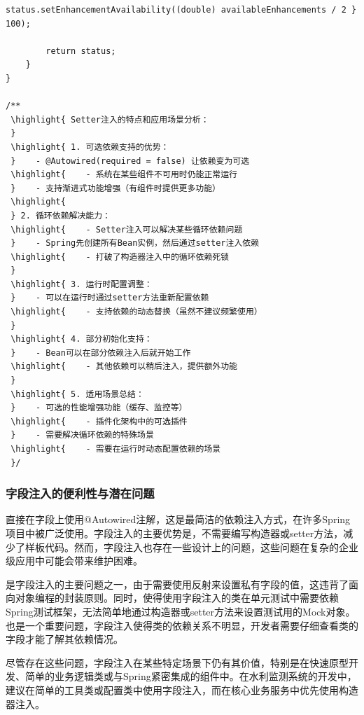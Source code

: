 \begin{lstlisting}[style=java]
        status.setEnhancementAvailability((double) availableEnhancements / 2 } 100);
        
        return status;
    }
}

/**
 \highlight{ Setter注入的特点和应用场景分析：
 } 
 \highlight{ 1. 可选依赖支持的优势：
 }    - @Autowired(required = false) 让依赖变为可选
 \highlight{    - 系统在某些组件不可用时仍能正常运行
 }    - 支持渐进式功能增强（有组件时提供更多功能）
 \highlight{ 
 } 2. 循环依赖解决能力：
 \highlight{    - Setter注入可以解决某些循环依赖问题
 }    - Spring先创建所有Bean实例，然后通过setter注入依赖
 \highlight{    - 打破了构造器注入中的循环依赖死锁
 } 
 \highlight{ 3. 运行时配置调整：
 }    - 可以在运行时通过setter方法重新配置依赖
 \highlight{    - 支持依赖的动态替换（虽然不建议频繁使用）
 } 
 \highlight{ 4. 部分初始化支持：
 }    - Bean可以在部分依赖注入后就开始工作
 \highlight{    - 其他依赖可以稍后注入，提供额外功能
 } 
 \highlight{ 5. 适用场景总结：
 }    - 可选的性能增强功能（缓存、监控等）
 \highlight{    - 插件化架构中的可选插件
 }    - 需要解决循环依赖的特殊场景
 \highlight{    - 需要在运行时动态配置依赖的场景
 }/
\end{lstlisting}

\hypertarget{ux5b57ux6bb5ux6ce8ux5165ux7684ux4fbfux5229ux6027ux4e0eux6f5cux5728ux95eeux9898}{%
\subsubsection{字段注入的便利性与潜在问题}\label{ux5b57ux6bb5ux6ce8ux5165ux7684ux4fbfux5229ux6027ux4e0eux6f5cux5728ux95eeux9898}}

直接在字段上使用@Autowired注解，这是最简洁的依赖注入方式，在许多Spring项目中被广泛使用。字段注入的主要优势是，不需要编写构造器或setter方法，减少了样板代码。然而，字段注入也存在一些设计上的问题，这些问题在复杂的企业级应用中可能会带来维护困难。

是字段注入的主要问题之一，由于需要使用反射来设置私有字段的值，这违背了面向对象编程的封装原则。同时，使得使用字段注入的类在单元测试中需要依赖Spring测试框架，无法简单地通过构造器或setter方法来设置测试用的Mock对象。也是一个重要问题，字段注入使得类的依赖关系不明显，开发者需要仔细查看类的字段才能了解其依赖情况。

尽管存在这些问题，字段注入在某些特定场景下仍有其价值，特别是在快速原型开发、简单的业务逻辑类或与Spring紧密集成的组件中。在水利监测系统的开发中，建议在简单的工具类或配置类中使用字段注入，而在核心业务服务中优先使用构造器注入。

